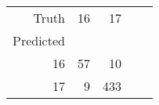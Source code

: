 \begin{tabular}{rrrrr}
\toprule
Truth & 16 & 17 \\
Predicted &  &  \\
\midrule
16 & 57 & 10 \\
17 & 9 & 433 \\
\bottomrule
\end{tabular}
